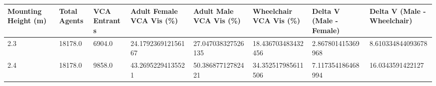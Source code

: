 \begin{tabular}{llllllll}
\hline
Mounting Height (m) & Total Agents & VCA Entrants & Adult Female VCA Vis (\%) & Adult Male VCA Vis (\%) & Wheelchair VCA Vis (\%) & Delta V (Male - Female) & Delta V (Male - Wheelchair) \\ \hline
2.3 & 18178.0 & 6904.0 & 24.179236912156167 & 27.047038327526135 & 18.436703483432456 & 2.867801415369968 & 8.610334844093678 \\
2.4 & 18178.0 & 9858.0 & 43.26952294135521 & 50.38687712782421 & 34.352517985611506 & 7.117354186468994 & 16.0343591422127 \\
\hline
\end{tabular}
